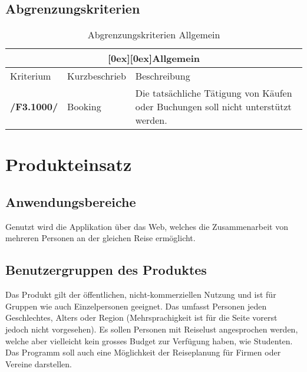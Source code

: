 \documentclass[10pt,a4paper,titlepage,twoside,german]{zhawreprt}
\newcommand{\AddRequirement}[2]{
\textbf{/#1#2/}
}
\newcommand{\D}[1]{
\AddRequirement{F3.}{#1}
}
\newcommand{\tableheader}[2]{\multicolumn{#1}{c}{\raisebox{-0.3em}[0ex][0ex]{\large{\textbf{#2}}}}}
\begin{document}
\section{Abgrenzungskriterien}\label{sec:DistinctionCriteria}
\begin{table}[ht]\centering
\begin{tabular}{l|p{4cm}|p{8cm}}\hline
\tableheader{3}{Allgemein}\\[0.3em]\hline
Kriterium & Kurzbeschrieb & Beschreibung\\\hline
\D{1000} & Booking & Die tatsächliche Tätigung von Käufen oder Buchungen soll nicht unterstützt werden.
\end{tabular}
\caption{Abgrenzungskriterien Allgemein}\label{tbl:DistinctionGeneral}
\end{table}
\chapter{Produkteinsatz}\label{chp:ProductApplication}
\section{Anwendungsbereiche}\label{sec:FieldOfApplience}
Genutzt wird die Applikation über das Web, welches die Zusammenarbeit von mehreren Personen an der gleichen Reise ermöglicht.
\section{Benutzergruppen des Produktes}\label{sec:TargetAudience}
Das Produkt gilt der öffentlichen, nicht-kommerziellen Nutzung und ist für Gruppen wie auch Einzelpersonen geeignet. Das umfasst Personen jeden Geschlechtes, Alters oder Region (Mehrsprachigkeit ist für die Seite vorerst jedoch nicht vorgesehen). Es sollen Personen mit Reiselust angesprochen werden, welche aber vielleicht kein grosses Budget zur Verfügung haben, wie Studenten. Das Programm soll auch eine Möglichkeit der Reiseplanung für Firmen oder Vereine darstellen.
\end{document}
